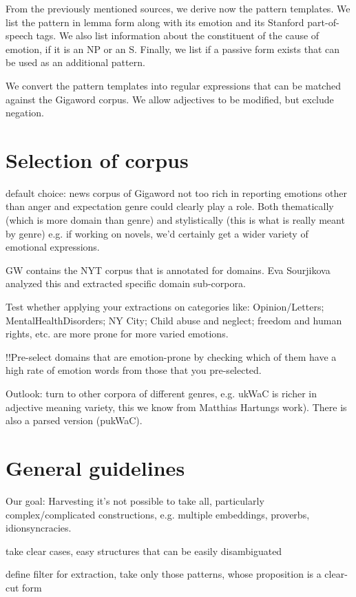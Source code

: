 From the previously mentioned sources, we derive now the pattern templates. We list the pattern in lemma form along with its emotion and its Stanford part-of-speech tags. We also list information about the constituent of the cause of emotion, if it is an NP or an S. Finally, we list if a passive form exists that can be used as an additional pattern.

We convert the pattern templates into regular expressions that can be matched against the Gigaword corpus. We allow adjectives to be modified, but exclude negation.

\section{Selection of corpus}

default choice: news corpus of Gigaword
not too rich in reporting emotions other than anger and expectation
genre could clearly play a role.
Both thematically (which is more domain than genre) and stylistically (this is what is really meant by genre)
e.g. if working on novels, we'd certainly get a wider variety of emotional expressions.

GW contains the NYT corpus that is annotated for domains. 
Eva Sourjikova analyzed this and extracted specific domain sub-corpora. 

Test whether applying your extractions on categories like: Opinion/Letters; MentalHealthDisorders; NY City; Child abuse and neglect; freedom and human rights, etc. are more prone for more varied emotions.

!!Pre-select domains that are emotion-prone by checking which of them have a high rate of emotion words from those that you pre-selected.

Outlook: turn to other corpora of different genres, e.g. ukWaC is richer in adjective meaning variety, this we know from Matthias Hartungs work). There is also a parsed version (pukWaC).

\section{General guidelines}

Our goal: Harvesting
it's not possible to take all, particularly complex/complicated constructions, e.g. multiple embeddings, proverbs, idionsyncracies.

take clear cases, easy structures that can be easily disambiguated

define filter for extraction, take only those patterns, whose proposition is a clear-cut form

